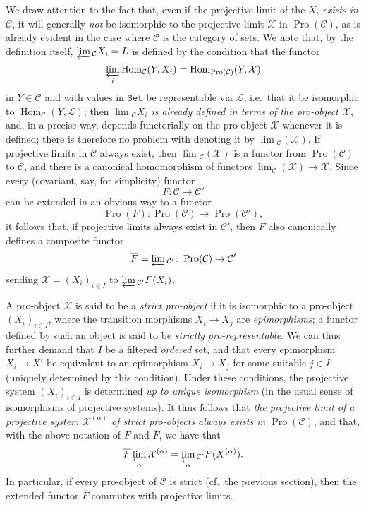 \documentclass{article}
\newcommand{\oldpage}[1]{\marginpar{\footnotesize$\Big\vert$ \textit{p.~#1}}}
\theoremstyle{definition}
\theoremstyle{definition}
\theoremstyle{definition}
\theoremstyle{definition}
\theoremstyle{remark}
\begin{document}
We draw attention to the fact that, even if the projective limit of the \(X_i\) \emph{exists in \({\mathcal{C}}\)}, it will generally \emph{not} be isomorphic to the projective limit \({\mathcal{X}}\) in \(\operatorname{Pro}({\mathcal{C}})\), as is already evident in the case where \({\mathcal{C}}\) is the category of sets.
We note that, by the definition itself, \(\varprojlim{}_{{\mathcal{C}}}X_i=L\) is defined by the condition that the functor
\[
  \varprojlim_i\operatorname{Hom}_{{\mathcal{C}}}(Y,X_i)=\operatorname{Hom}_{\operatorname{Pro}({\mathcal{C}})}(Y,{\mathcal{X}})
\]
in \(Y\in{\mathcal{C}}\) and with values in \(\mathtt{Set}\) be representable via \({\mathcal{L}}\), i.e.~that it be isomorphic to \(\operatorname{Hom}_{{\mathcal{C}}}(Y,{\mathcal{L}})\);
then \emph{\(\lim{}_{{\mathcal{C}}}X_i\) is already defined in terms of the \emph{pro-object} \({\mathcal{X}}\)}, and, in a precise way, depends functorially on the pro-object \({\mathcal{X}}\) whenever it is defined;
there is therefore no problem with denoting it by \(\lim{}_{{\mathcal{C}}}({\mathcal{X}})\).
If projective limits in \({\mathcal{C}}\) always exist, then \(\lim{}_{{\mathcal{C}}}({\mathcal{X}})\) is a functor from \(\operatorname{Pro}({\mathcal{C}})\) to \({\mathcal{C}}\), and there is a canonical homomorphism of functors \(\lim_{\mathcal{C}}({\mathcal{X}})\to{\mathcal{X}}\).
Since every (covariant, say, for simplicity) functor
\[
  F\colon {\mathcal{C}} \to {\mathcal{C}}'
\]
can be extended in an obvious way to a functor
\[
  \operatorname{Pro}(F)\colon \operatorname{Pro}({\mathcal{C}}) \to \operatorname{Pro}({\mathcal{C}}'),
\]
it follows that, if projective limits always exist in \({\mathcal{C}}'\), then \(F\) also canonically defines a composite functor
\[
  \overline{F} = \varprojlim{}_{{\mathcal{C}}'}\colon \operatorname{Pro}({\mathcal{C}}) \to {\mathcal{C}}'
\]
sending \({\mathcal{X}}=(X_i)_{i\in I}\) to \(\varprojlim{}_{{\mathcal{C}}'}F(X_i)\).

A pro-object \({\mathcal{X}}\) is said to be a \emph{strict pro-object} if it is isomorphic to a pro-object \((X_i)_{i\in I}\), where the transition morphisms \(X_i\to X_j\) are \emph{epimorphisms};
a functor defined by such an object is said to be \emph{strictly pro-representable}.
We can thus further demand that \(I\) be a filtered \emph{ordered} set, and that every epimorphism \(X_i\to X'\) be equivalent to an epimorphism \(X_i\to X_j\) for some suitable \(j\in I\) (uniquely determined by this condition).
\oldpage{195-05}Under these conditions, the projective system \((X_i)_{i\in I}\) is determined \emph{up to unique isomorphism} (in the usual sense of isomorphisms of projective systems).
It thus follows that \emph{the projective limit of a projective system \({\mathcal{X}}^{(\alpha)}\) of strict pro-objects always exists in \(\operatorname{Pro}({\mathcal{C}})\)}, and that, with the above notation of \(F\) and \(\overline{F}\), we have that
\[
  \overline{F}\varprojlim_\alpha{\mathcal{X}}^{(\alpha)} = \varprojlim_\alpha{}_{{\mathcal{C}}'}F(X^{(\alpha)}).
\]
In particular, if every pro-object of \({\mathcal{C}}\) is strict (cf.~the previous section), then the extended functor \(\overline{F}\) commutes with projective limits.
\end{document}
